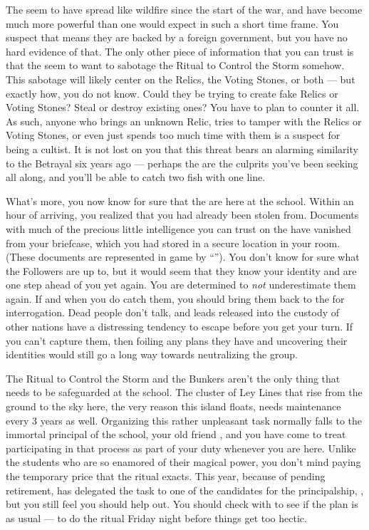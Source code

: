 \documentclass[char]{GL2020}
\begin{document}
The \pGoaties{} seem to have spread like wildfire since the start of the war, and have become much more powerful than one would expect in such a short time frame. You suspect that means they are backed by a foreign government, but you have no hard evidence of that. The only other piece of information that you can trust is that the \pGoaties{} seem to want to sabotage the Ritual to Control the Storm somehow. This sabotage will likely center on the Relics, the Voting Stones, or both — but exactly how, you do not know. Could they be trying to create fake Relics or Voting Stones? Steal or destroy existing ones? You have to plan to counter it all. As such, anyone who brings an unknown Relic, tries to tamper with the Relics or Voting Stones, or even just spends too much time with them is a suspect for being a cultist. It is not lost on you that this threat bears an alarming similarity to the Betrayal six years ago — perhaps the \pGoaties{} are the culprits you’ve been seeking all along, and you’ll be able to catch two fish with one line.

What's more, you now know for sure that the \pGoaties{} are here at the school. Within an hour of arriving, you realized that you had already been stolen from. Documents with much of the precious little intelligence you can trust on the \pGoaties{} have vanished from your briefcase, which you had stored in a secure location in your room. (These documents are represented in game by ``\iFolderOfNotes{}''). You don't know for sure what the Followers are up to, but it would seem that they know your identity and are one step ahead of you yet again. You are determined to \emph{not} underestimate them again. If and when you do catch them, you should bring them back to the \pShip{} for interrogation. Dead people don't talk, and leads released into the custody of other nations have a distressing tendency to escape before you get your turn. If you can't capture them, then foiling any plans they have and uncovering their identities would still go a long way towards neutralizing the group.

The Ritual to Control the Storm and the Bunkers aren't the only thing that needs to be safeguarded at the school. The cluster of Ley Lines that rise from the ground to the sky here, the very reason this island floats, needs maintenance every 3 years as well. Organizing this rather unpleasant task normally falls to the immortal principal of the school, your old friend \cPrincipal{}, and you have come to treat participating in that process as part of your duty whenever you are here. Unlike the students who are so enamored of their magical power, you don't mind paying the temporary price that the ritual exacts. This year, because of \cPrincipal{\their} pending retirement, \cPrincipal{} has delegated the task to one of the candidates for the principalship, \cBeetle{\full}, but you still feel you should help out. You should check with \cBeetle{} to see if the plan is as usual — to do the ritual Friday night before things get too hectic.
\end{document}
